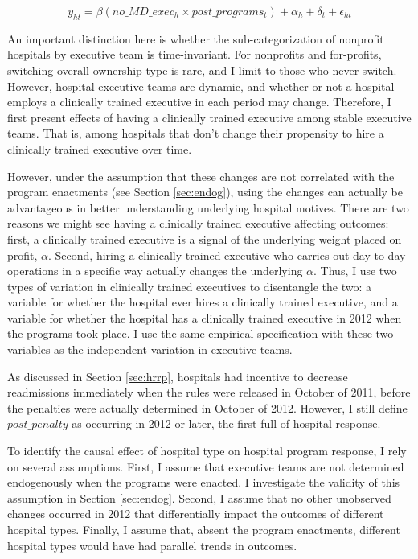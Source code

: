 \documentclass[12pt]{article}
\begin{document}
    \begin{equation}
    \label{eq:clinical}
    y_{ht} = \beta (no\_MD\_exec_h \times post\_programs_t) + \alpha_{h} + \delta_t + \epsilon_{ht}
    \end{equation}

    An important distinction here is whether the sub-categorization of nonprofit hospitals by executive team is time-invariant. For nonprofits and for-profits, switching overall ownership type is rare, and I limit to those who never switch. However, hospital executive teams are dynamic, and whether or not a hospital employs a clinically trained executive in each period may change. Therefore, I first present effects of having a clinically trained executive among stable executive teams. That is, among hospitals that don't change their propensity to hire a clinically trained executive over time. 
    
    However, under the assumption that these changes are not correlated with the program enactments (see Section \ref{sec:endog}), using the changes can actually be advantageous in better understanding underlying hospital motives. There are two reasons we might see having a clinically trained executive affecting outcomes: first, a clinically trained executive is a signal of the underlying weight placed on profit, $\alpha$. Second, hiring a clinically trained executive who carries out day-to-day operations in a specific way actually changes the underlying $\alpha$. Thus, I use two types of variation in clinically trained executives to disentangle the two: a variable for whether the hospital ever hires a clinically trained executive, and a variable for whether the hospital has a clinically trained executive in 2012 when the programs took place. I use the same empirical specification with these two variables as the independent variation in executive teams. 
    
    As discussed in Section \ref{sec:hrrp}, hospitals had incentive to decrease readmissions immediately when the rules were released in October of 2011, before the penalties were actually determined in October of 2012. However, I still define $post\_penalty$ as occurring in 2012 or later, the first full of hospital response.

    To identify the causal effect of hospital type on hospital program response, I rely on several assumptions. First, I assume that executive teams are not determined endogenously when the programs were enacted. I investigate the validity of this assumption in Section \ref{sec:endog}. Second, I assume that no other unobserved changes occurred in 2012 that differentially impact the outcomes of different hospital types. Finally, I assume that, absent the program enactments, different hospital types would have had parallel trends in outcomes. 
\end{document}
